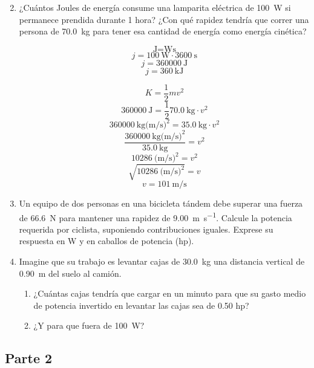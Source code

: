 \documentclass[Física - Práctica.root.tex]{subfiles}
\begin{document}
\begin{enumerate}
\begin{multicols}{2}
\begin{enumerate}
          \end{enumerate}
        \end{multicols}

  \item ¿Cuántos Joules de energía consume una lamparita eléctrica de \SI{100}{\watt} si permanece
        prendida durante 1 hora? ¿Con qué rapidez tendría que correr una persona de \SI{70,0}{\kilo\gram} para
        tener esa cantidad de energía como energía cinética?
        \begin{center}
          \[ \si{\joule} = \si{\watt\second} \]
          \[ j = \SI{100}{\watt}\cdot\SI{3600}{\second} \]
          \[ j = \SI{360000}{\joule} \]
          \[ \boxed{j = \SI{360}{\kilo\joule}} \]

          \[ K = \frac{1}{2}mv^2 \]
          \[ \SI{360000}{\joule} = \frac{1}{2}\SI{70,0}{\kilo\gram}\cdot v^2 \]
          \[ \SI{360000}{\kilo\gram(\meter\per\second)^2} = \SI{35,0}{\kilo\gram}\cdot v^2 \]
          \[ \frac{\SI{360000}{\kilo\gram(\meter\per\second)^2}}{\SI{35,0}{\kilo\gram}} = v^2 \]
          \[ \SI{10286}{(\meter\per\second)^2} = v^2 \]
          \[ \sqrt{\SI{10286}{(\meter\per\second)^2}} = v \]
          \[ \boxed{v = \SI{101}{\meter\per\second}} \]
        \end{center}

  \item Un equipo de dos personas en una bicicleta tándem debe superar una fuerza de \SI{66,6}{\newton}
        para mantener una rapidez de \SI[per-mode=fraction]{9,00}{\meter\per\second}. Calcule la potencia requerida por ciclista,
        suponiendo contribuciones iguales. Exprese su respuesta en \si{\watt} y en caballos de potencia (hp).

  \item Imagine que su trabajo es levantar cajas de \SI{30,0}{\kilo\gram} una distancia vertical de \SI{0,90}{\meter} del
        suelo al camión.
        \begin{enumerate}
          \item ¿Cuántas cajas tendría que cargar en un minuto para que su gasto medio de potencia
                invertido en levantar las cajas sea de \num{0,50} hp?
          \item ¿Y para que fuera de \SI{100}{\watt}?
        \end{enumerate}
\end{enumerate}

\subsection{Parte 2}
\begin{enumerate}

\end{enumerate}
\end{document}
